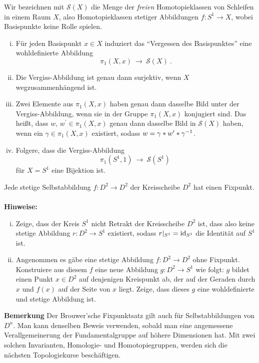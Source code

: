 
\begin{aufgabe}\label{freieSchlingen}
		Wir bezeichnen mit $\mathcal S(X)$ die Menge
	der {\itshape freien} Homotopieklassen von Schleifen in einem Raum $X$,
	also Homotopieklassen stetiger Abbildungen $f\colon S^1\to X$,
	wobei Basispunkte keine Rolle spielen.
	\begin{enumerate}[i)]
		\item Für jeden Basispunkt $x\in X$ induziert das 
		"`Vergessen des Basispunktes"' eine wohldefinierte Abbildung
		\[ \pi_1(X,x) \ \to \ \mathcal S(X)\ . \]
		\item Die Vergiss-Abbildung ist genau dann surjektiv,
		wenn $X$ wegzusammenhängend ist.
		\item Zwei Elemente aus $\pi_1(X,x)$ haben genau dann dasselbe Bild
		unter der Vergiss-Abbildung, wenn sie in der
		Gruppe $\pi_1(X,x)$ konjugiert sind. Das heißt, dass $w, \, w^\prime \in \pi_1(X,x)$ genau dann dasselbe Bild in $\mathcal S(X)$ haben, wenn ein $\gamma\in \pi_1(X,x)$ existiert, sodass $w= \gamma \ast w^\prime \ast \gamma^{-1}$.
		\item Folgere, dass die Vergiss-Abbildung
		\[ \pi_1(S^1,1) \ \to \ \mathcal S(S^1)\  \]
		für $X=S^1$ eine Bijektion ist.
	\end{enumerate}
\end{aufgabe}

\begin{aufgabe} Jede stetige
	Selbstabbildung $f\colon D^2 \to D^2$ der Kreisscheibe $D^2$ hat einen Fixpunkt.\\~\\	
	\textbf{Hinweise:}
	\begin{enumerate}[i)]
		\item Zeige, dass der Kreis $S^1$ nicht Retrakt der Kreisscheibe $D^2$ ist, dass also keine stetige Abbildung $r\colon D^2\to S^1$ existiert, sodass $r|_{S^1} = \mathrm{id}_{S^1}$ die Identität auf $S^1$ ist.
		
		\item Angenommen es gäbe eine stetige Abbildung $f\colon D^2 \rightarrow D^2$ ohne Fixpunkt. Konstruiere aus diesem $f$ eine neue Abbildung
		$g \colon D^2 \rightarrow S^1$ wie folgt: $g$ bildet einen Punkt $x \in D^2$ auf	denjenigen Kreispunkt ab, der auf der Geraden durch $x$ und $f(x)$ auf der Seite von $x$ liegt. Zeige, dass dieses $g$ eine wohldefinierte und stetige Abbildung ist.
	\end{enumerate}
	\textbf{Bemerkung}
		Der Brouwer'sche Fixpunktsatz gilt auch für Selbstabbildungen von $D^n$. Man kann denselben Beweis verwenden, sobald man eine angemessene Verallgemeinerung der Fundamentalgruppe auf höhere Dimensionen hat. Mit zwei solchen Invarianten, Homologie- und Homotopiegruppen, werden sich die nächsten Topologiekurse beschäftigen.
\end{aufgabe}

